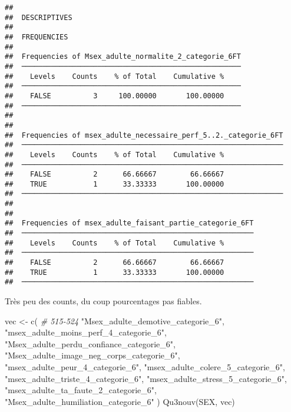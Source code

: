 \documentclass[
]{article}
\newenvironment{Shaded}{\begin{snugshade}}{\end{snugshade}}
\newcommand{\CommentTok}[1]{\textcolor[rgb]{0.56,0.35,0.01}{\textit{#1}}}
\newcommand{\FunctionTok}[1]{\textcolor[rgb]{0.00,0.00,0.00}{#1}}
\newcommand{\NormalTok}[1]{#1}
\newcommand{\OtherTok}[1]{\textcolor[rgb]{0.56,0.35,0.01}{#1}}
\newcommand{\StringTok}[1]{\textcolor[rgb]{0.31,0.60,0.02}{#1}}
\begin{document}
\begin{verbatim}
## 
##  DESCRIPTIVES
## 
##  FREQUENCIES
## 
##  Frequencies of Msex_adulte_normalite_2_categorie_6FT 
##  ──────────────────────────────────────────────────── 
##    Levels    Counts    % of Total    Cumulative %   
##  ──────────────────────────────────────────────────── 
##    FALSE          3     100.00000       100.00000   
##  ──────────────────────────────────────────────────── 
## 
## 
##  Frequencies of msex_adulte_necessaire_perf_5..2._categorie_6FT 
##  ────────────────────────────────────────────────────────────── 
##    Levels    Counts    % of Total    Cumulative %   
##  ────────────────────────────────────────────────────────────── 
##    FALSE          2      66.66667        66.66667   
##    TRUE           1      33.33333       100.00000   
##  ────────────────────────────────────────────────────────────── 
## 
## 
##  Frequencies of msex_adulte_faisant_partie_categorie_6FT 
##  ─────────────────────────────────────────────────────── 
##    Levels    Counts    % of Total    Cumulative %   
##  ─────────────────────────────────────────────────────── 
##    FALSE          2      66.66667        66.66667   
##    TRUE           1      33.33333       100.00000   
##  ───────────────────────────────────────────────────────
\end{verbatim}

Très peu des counts, du coup pourcentages pas fiables.

\begin{Shaded}
\begin{Highlighting}[]
\NormalTok{vec }\OtherTok{\textless{}{-}} \FunctionTok{c}\NormalTok{(  }\CommentTok{\# 515{-}524}
  \StringTok{"Msex\_adulte\_demotive\_categorie\_6"}\NormalTok{,}
  \StringTok{"msex\_adulte\_moins\_perf\_4\_categorie\_6"}\NormalTok{,}
  \StringTok{"Msex\_adulte\_perdu\_confiance\_categorie\_6"}\NormalTok{,}
  \StringTok{"Msex\_adulte\_image\_neg\_corps\_categorie\_6"}\NormalTok{,}
  \StringTok{"msex\_adulte\_peur\_4\_categorie\_6"}\NormalTok{,}
  \StringTok{"msex\_adulte\_colere\_5\_categorie\_6"}\NormalTok{,}
  \StringTok{"msex\_adulte\_triste\_4\_categorie\_6"}\NormalTok{,}
  \StringTok{"msex\_adulte\_stress\_5\_categorie\_6"}\NormalTok{,}
  \StringTok{"msex\_adulte\_ta\_faute\_2\_categorie\_6"}\NormalTok{,}
  \StringTok{"Msex\_adulte\_humiliation\_categorie\_6"}\NormalTok{  )}
\FunctionTok{Qu3nouv}\NormalTok{(SEX, vec)}
\end{Highlighting}
\end{Shaded}
\end{document}
